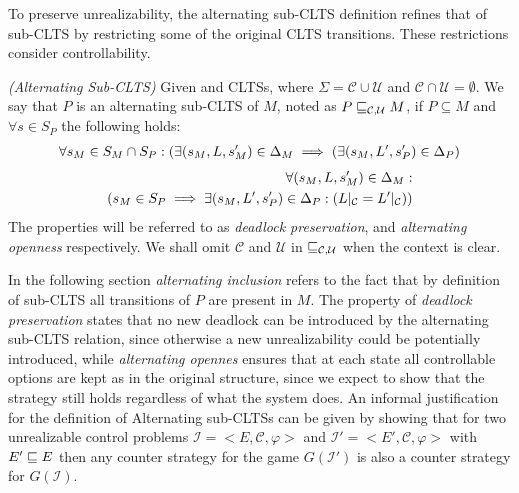 To preserve unrealizability, the alternating sub-CLTS definition refines that of sub-CLTS by restricting some of the original CLTS transitions. 
These restrictions consider controllability. 
\begin{definition}\label{def:alternating_sub_clts}\emph{(Alternating Sub-CLTS)}
	Given  and
	 CLTSs, 
	where $\Sigma =\mathcal{C}\cup \mathcal{U}$ and $\mathcal{C}\cap
	\mathcal{U}=\emptyset$. We say that $P$ is an alternating
	sub-CLTS of $M$, noted as $P \sqsubseteq_{\mathcal{C},\mathcal{U}} M$, if  $P \subseteq M$  and $\forall s \in S_{P}$ the following holds:
	\footnotesize
		\begin{align}
\begin{aligned}
\forall s_{M} \in S_{M}\cap S_{P}:(\exists (s_M,L,s'_M) \in \Delta_M \implies (\exists (s_M,L',s'_P) \in \Delta_P)
\end{aligned}
\end{align}	
\begin{align}
\begin{aligned}
\forall (s_M,L,s'_M) \in \Delta_M:\\ 
(s_M \in S_P \implies\exists (s_M,L',s'_P) \in \Delta_P:(L|_{\mathcal{C}} = L'|_{\mathcal{C}}))
\end{aligned}
\end{align}	
	\normalsize
	The properties will be referred to as \emph{deadlock preservation}, and \emph{alternating openness} respectively. We shall omit $\mathcal{C}$ and $\mathcal{U}$ in $\sqsubseteq_{\mathcal{C},\mathcal{U}}$ when the context is clear. 
\end{definition}
 
In the following section \emph{alternating inclusion} refers to the fact that by definition of sub-CLTS all transitions of $P$ are present in $M$.
The property of \emph{deadlock preservation} states that no new deadlock can be introduced by the alternating sub-CLTS relation, since otherwise a new unrealizability could be potentially introduced, while \emph{alternating opennes} ensures that at each state all controllable options are kept as in the original structure, since we expect to show that the strategy still holds regardless of what the system does.
An informal justification for the definition of Alternating sub-CLTSs can be given by showing that for two unrealizable control problems $\mathcal{I} = <E, \mathcal{C}, \varphi>$ and $\mathcal{I'} = <E', \mathcal{C}, \varphi>$ with $E' \sqsubseteq E$ then any counter strategy for the game $G(\mathcal{I'})$ is also a counter strategy for $G(\mathcal{I})$. 

